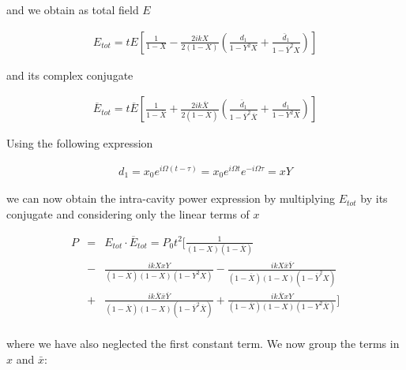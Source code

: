 and we obtain as total field $E$

\begin{eqnarray*}
E_{tot}=tE\left [\frac{1}{1-X}- \frac{2ikX}{2(1-X)}   \left ( \frac{d_1}{1-Y^2 X} +\frac{\bar{d}_1}{1-\overline{Y}^2 X}\right )\right]
\end{eqnarray*}

and its complex conjugate 

\begin{eqnarray*}
\overline{E}_{tot}=t\overline{E}\left [\frac{1}{1-\overline{X}}+\frac{2ik\overline{X}}{2(1-\overline{X})}   \left ( \frac{\bar{d}_1}{1-\overline{Y}^2 \overline{X}}+\frac{d_1}{1-Y^2 \overline{X}}\right )\right]
\end{eqnarray*}
 
Using the following expression
 
\begin{eqnarray}
d_1=x_0e^{i\Omega(t-\tau)}=x_0e^{i\Omega t}e^{-i\Omega\tau}=xY  
\end{eqnarray}
 
we can now obtain the intra-cavity power expression by multiplying $E_{tot}$ by its conjugate
and considering only the linear terms of $x$
 
\begin{eqnarray}
P&=&E_{tot}\cdot \overline{E}_{tot}=P_0 t^2[ \frac{1}{(1-X)(1-\overline{X})}\nonumber\\  
&-&\frac{ikX xY}{(1-\overline{X})(1-X)(1-Y^2 X)} -
\frac{ikX \bar{x}\overline{Y}}{(1-\overline{X})(1-X)(1-\overline{Y}^2 X)}\nonumber \\
&+&\frac{ik\overline{X} \bar{x}\overline{Y} } {(1-\overline{X})(1-X)(1-\overline{Y}^2 \overline{X})}+ 
\frac{ik\overline{X} xY}{(1-\overline{X})(1-X)(1-Y^2 \overline{X})}]  \nonumber \\
\end{eqnarray}

where we have also neglected the first constant term. We now group the terms in $x$ and $\bar{x}$:

